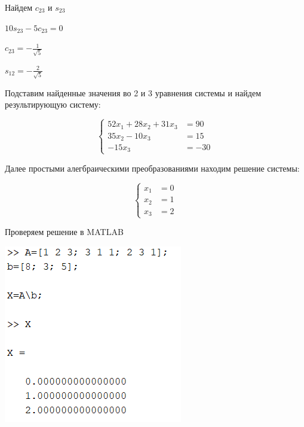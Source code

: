 Найдем
\begin{math}
	c_{23}
\end{math} и
\begin{math}
	s_{23}
\end{math}

\begin{math}
	10s_{23}-5c_{23}=0
\end{math}

\begin{math}
	c_{23}=-\frac1{\sqrt{5}}
\end{math}

\begin{math}
	s_{12}=-\frac2{\sqrt{5}}
\end{math}

Подставим найденные значения во 2 и 3 уравнения системы и найдем результирующую систему:

\begin{equation*}
	\begin{cases}
		52x_{1}+28x_{2}+31x_{3}&=90\\
		35x_{2}-10x_{3}&=15\\
		-15x_{3}&=-30
	\end{cases}
\end{equation*}

Далее простыми алегбраическими преобразованиями находим решение системы:

\begin{equation*}
	\begin{cases}
		x_{1}&=0\\
		x_{2}&=1\\
		x_{3}&=2
	\end{cases}
\end{equation*}

Проверяем решение в MATLAB

\includegraphics[scale=0.5]{test.png}


